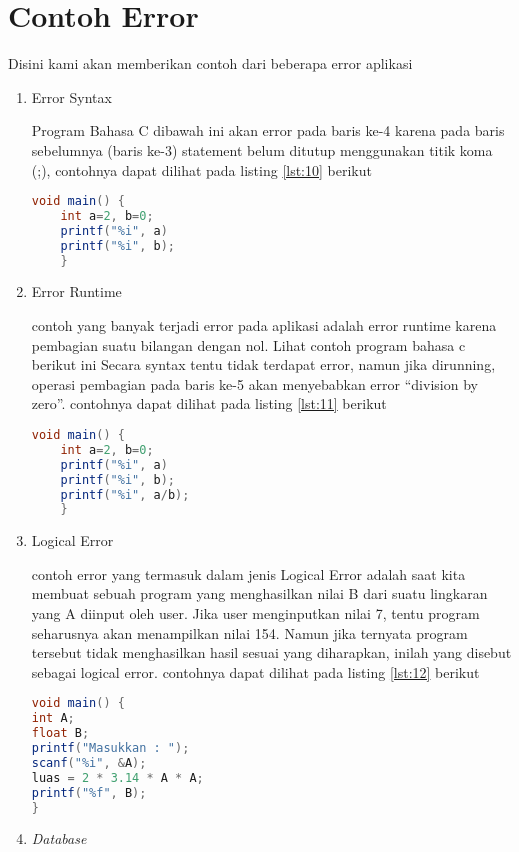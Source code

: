 \chapter{Contoh Error}

\par
Disini kami akan memberikan contoh dari beberapa error aplikasi 

\begin{enumerate}
\item Error Syntax 
\par
Program Bahasa C dibawah ini akan error pada baris ke-4 karena pada baris sebelumnya (baris ke-3) statement belum ditutup menggunakan titik koma (;), contohnya dapat dilihat pada listing \ref{lst:10} berikut
\begin{lstlisting}[language=Java, caption=Contoh \textit{syntax error},label={lst:10}]
	void main() {
	int a=2, b=0;
	printf("%i", a)
	printf("%i", b);
	}
\end{lstlisting}
\item Error Runtime
\par 
contoh yang banyak terjadi error pada aplikasi adalah error runtime karena pembagian suatu bilangan dengan nol. Lihat contoh program bahasa c berikut ini Secara syntax tentu tidak terdapat error, namun jika dirunning, operasi pembagian pada baris ke-5 akan menyebabkan error “division by zero”. contohnya dapat dilihat pada listing \ref{lst:11} berikut
\begin{lstlisting}[language=Java, caption=Contoh \textit{division by zero error},label={lst:11}]
	void main() {
	int a=2, b=0;
	printf("%i", a)
	printf("%i", b);
	printf("%i", a/b);
	}
\end{lstlisting}
\item Logical Error
\par
contoh error yang termasuk dalam jenis Logical Error adalah saat kita membuat sebuah program yang menghasilkan nilai B dari suatu lingkaran yang A diinput oleh user. Jika user menginputkan nilai 7, tentu program seharusnya akan menampilkan nilai 154. Namun jika ternyata program tersebut tidak menghasilkan hasil sesuai yang diharapkan, inilah yang disebut sebagai logical error. contohnya dapat dilihat pada listing \ref{lst:12} berikut
\begin{lstlisting}[language=Java, caption=Contoh \textit{logical error},label={lst:12}]
void main() {
int A;
float B;
printf("Masukkan : ");
scanf("%i", &A);
luas = 2 * 3.14 * A * A;
printf("%f", B);
}
\end{lstlisting}
\item \textit{Database}

\end{enumerate}
